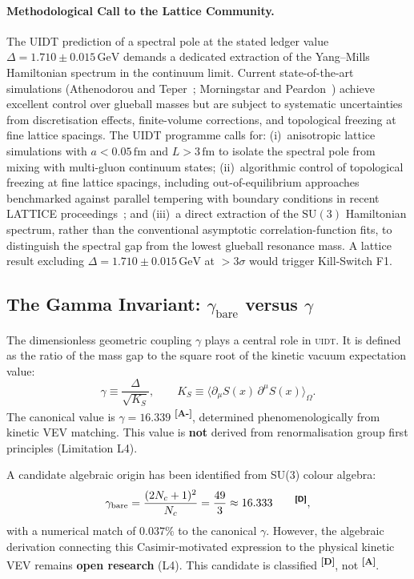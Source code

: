 \documentclass[12pt,a4paper,twoside]{article}
\theoremstyle{plain}
\theoremstyle{definition}
\theoremstyle{remark}
\newcommand{\UIDT}{\textsc{uidt}}
\newcommand{\GeV}{\,\mathrm{GeV}}
\newcommand{\catmark}[1]{\textsuperscript{\textsf{\textbf{[#1]}}}}
\newcommand{\Sx}{S(x)}
\newcommand{\DeltaGap}{1.710 \pm 0.015\GeV}        %
\newcommand{\GammaGeom}{16.339}                     %
\begin{document}
\paragraph{Methodological Call to the Lattice Community.}
The UIDT prediction of a spectral pole at the stated ledger value
$\Delta = \DeltaGap$ demands
a dedicated extraction of the Yang--Mills Hamiltonian spectrum in the
continuum limit. Current state-of-the-art simulations (Athenodorou and
Teper~\cite{Athenodorou2021}; Morningstar and Peardon~\cite{Morningstar1999})
achieve excellent control over glueball masses but are subject to
systematic uncertainties from discretisation effects, finite-volume
corrections, and topological freezing at fine lattice spacings.
The UIDT programme calls for: (i)~anisotropic lattice simulations with
$a < 0.05\,\mathrm{fm}$ and $L > 3\,\mathrm{fm}$ to isolate the spectral
pole from mixing with multi-gluon continuum states;
(ii)~algorithmic control of topological freezing at fine lattice spacings,
including out-of-equilibrium approaches benchmarked against parallel tempering
with boundary conditions in recent LATTICE proceedings~\cite{Vadacchino2024};
and (iii)~a direct extraction of the
$\mathrm{SU}(3)$ Hamiltonian spectrum, rather than the conventional
asymptotic correlation-function fits, to distinguish the spectral
gap from the lowest glueball resonance mass.
A lattice result excluding $\Delta = 1.710 \pm 0.015\GeV$ at $> 3\sigma$
would trigger Kill-Switch F1.

\subsection{The Gamma Invariant: \texorpdfstring{$\gamma_{\mathrm{bare}}$}{γ\_bare} versus \texorpdfstring{$\gamma$}{γ}}
\label{subsec:gamma}

The dimensionless geometric coupling $\gamma$ plays a central role in \UIDT.
It is defined as the ratio of the mass gap to the square root of the kinetic
vacuum expectation value:
\begin{equation}
  \gamma \equiv \frac{\Delta}{\sqrt{K_S}}, \qquad
  K_S \equiv \langle \partial_\mu \Sx\, \partial^\mu \Sx \rangle_\Omega.
\end{equation}
The canonical value is $\gamma = \GammaGeom$ \catmark{A-}, determined
phenomenologically from kinetic VEV matching. This value is \textbf{not}
derived from renormalisation group first principles (Limitation L4).

A candidate algebraic origin has been identified from SU(3) colour algebra:
\begin{equation}
  \gamma_{\mathrm{bare}} = \frac{(2N_c + 1)^2}{N_c}
  = \frac{49}{3} \approx 16.333 \qquad \catmark{D},
\end{equation}
with a numerical match of $0.037\%$ to the canonical $\gamma$. However, the
algebraic derivation connecting this Casimir-motivated expression to the
physical kinetic VEV remains \textbf{open research} (L4). This candidate is
classified \catmark{D}, not \catmark{A}.
\end{document}
